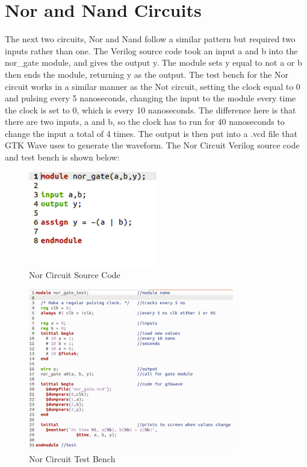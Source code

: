 \documentclass[runningheads, 12pt]{report}
\begin{document}
		\section{Nor and Nand Circuits}
	
	The next two circuits, Nor and Nand follow a similar pattern but required two inputs rather than one. The Verilog source code took an input a and b into the nor\_gate module, and gives the output y. The module sets y equal to not a or b  then ends the module, returning y as the output. The test bench for the Nor circuit works in a similar manner as the Not circuit, setting the clock equal to 0 and pulsing every 5 nanoseconds, changing the input to the module every time the clock is set to 0, which is every 10 nanoseconds. The difference here is that there are two inputs, a and b, so the clock has to run for 40 nanoseconds to change the input a total of 4 times. The output is then put into a .vcd file that GTK Wave uses to generate the waveform. The Nor Circuit Verilog source code and test bench is shown below:
	
\begin{figure}[h]
	\centering
	\includegraphics[width=0.5\textwidth]{nor_gate_sc}
	\caption{Nor Circuit Source Code}
	\label{fig: nor_gate_sc}
\end{figure}

\begin{figure}[h]
	\centering
	\includegraphics[width=0.8\textwidth]{nor_gate_test}
	\caption{Nor Circuit Test Bench}
	\label{fig: nor_gate_test}
\end{figure}
\end{document}

